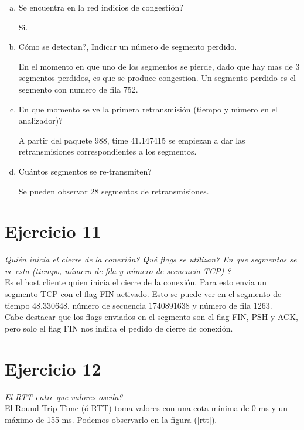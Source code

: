 \documentclass[osajnl,twocolumn,showpacs,superscriptaddress,10pt]{revtex4-1} %
\begin{document}
\begin{enumerate}[a)]
    \item Se encuentra en la red indicios de congestión?

    Si.

    \item Cómo se detectan?, Indicar un número de segmento perdido.

    En el momento en que uno de los segmentos se pierde, dado que hay mas de 3 segmentos perdidos, es que se produce congestion. Un segmento perdido es
    el segmento con numero de fila 752.

    \item En que momento se ve la primera retransmisión (tiempo y número en el analizador)?

    A partir del paquete 988, time 41.147415 se empiezan a dar las retransmisiones correspondientes a los segmentos.

    \item Cuántos segmentos se re-transmiten?

    Se pueden observar 28 segmentos de retransmisiones.
\end{enumerate}

\section{Ejercicio 11}

\textit{Quién inicia el cierre de la conexión? Qué flags se utilizan? En que segmentos se ve esta (tiempo, número de fila y número de secuencia TCP) ?} \\

Es el host cliente quien inicia el cierre de la conexión. Para esto envia un segmento TCP con el flag FIN activado. Esto se puede ver en el 
segmento de tiempo 48.330648, número de secuencia 1740891638 y número de fila 1263. \\

Cabe destacar que los flags enviados en el segmento son el flag FIN, PSH y ACK, pero solo el flag FIN nos indica el pedido de cierre de conexión. \\

\section{Ejercicio 12}

\textit{El RTT entre que valores oscila?} \\

El Round Trip Time (ó RTT) toma valores con una cota mínima de 0 ms y un máximo de 155 ms. Podemos observarlo en la figura (\ref{rtt}). \\
\end{document}
